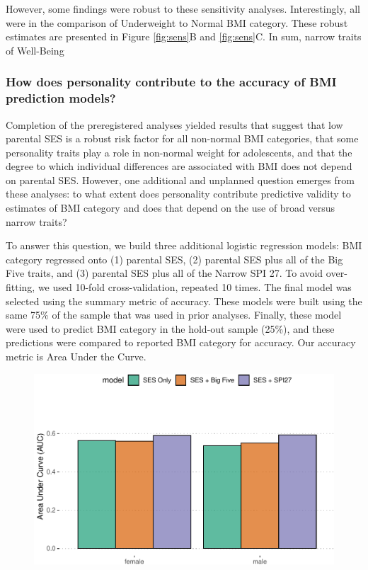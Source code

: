 \documentclass[man]{apa6}
\begin{document}
However, some findings were robust to these sensitivity analyses. Interestingly, all were in the comparison of Underweight to Normal BMI category. These robust estimates are presented in Figure \ref{fig:sens}B and \ref{fig:sens}C. In sum, narrow traits of Well-Being

\hypertarget{how-does-personality-contribute-to-the-accuracy-of-bmi-prediction-models}{%
\subsubsection{How does personality contribute to the accuracy of BMI prediction models?}\label{how-does-personality-contribute-to-the-accuracy-of-bmi-prediction-models}}

Completion of the preregistered analyses yielded results that suggest that low parental SES is a robust risk factor for all non-normal BMI categories, that some personality traits play a role in non-normal weight for adolescents, and that the degree to which individual differences are associated with BMI does not depend on parental SES. However, one additional and unplanned question emerges from these analyses: to what extent does personality contribute predictive validity to estimates of BMI category and does that depend on the use of broad versus narrow traits?

To answer this question, we build three additional logistic regression models: BMI category regressed onto (1) parental SES, (2) parental SES plus all of the Big Five traits, and (3) parental SES plus all of the Narrow SPI 27. To avoid over-fitting, we used 10-fold cross-validation, repeated 10 times. The final model was selected using the summary metric of accuracy. These models were built using the same 75\% of the sample that was used in prior analyses. Finally, these model were used to predict BMI category in the hold-out sample (25\%), and these predictions were compared to reported BMI category for accuracy. Our accuracy metric is Area Under the Curve.

\begin{figure}
\includegraphics[width=5in]{bmi_personality_files/figure-latex/auc-1} \caption{ }\label{fig:auc}
\end{figure}
\end{document}
